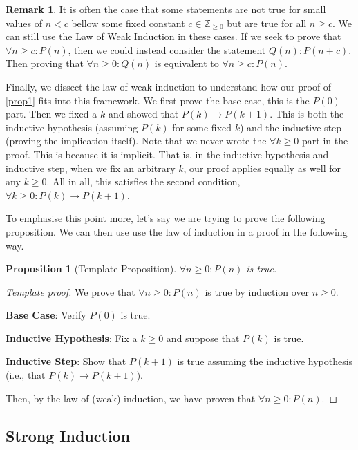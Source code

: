 \documentclass{article}
\theoremstyle{plain}
\newtheorem*{proposition*}{Proposition}
\theoremstyle{definition}
\newtheorem{remark}[theorem]{Remark}
\newcommand{\ra}{\rightarrow}
\newcommand{\ZZ}{\mathbb{Z}_{\geq 0}}
\begin{document}
\begin{remark}
    It is often the case that some statements are not true for small values of \(n < c\) bellow some fixed constant \(c \in \ZZ\) but are true for all \(n \geq c\). We can still use the Law of Weak Induction in these cases. If we seek to prove that \(\forall n \geq c : P(n)\), then we could instead consider the statement \(Q(n) : P(n + c)\). Then proving that \(\forall n \geq 0: Q(n)\) is equivalent to \(\forall n \geq c : P(n)\).
\end{remark}

Finally, we dissect the law of weak induction to understand how our proof of \cref{prop1} fits into this framework. We first prove the base case, this is the \(P(0)\) part. Then we fixed a \(k\) and showed that \(P(k) \ra P(k+1)\). This is both the inductive hypothesis (assuming \(P(k)\) for some fixed \(k\)) and the inductive step (proving the implication itself). Note that we never wrote the \(\forall k \geq 0\) part in the proof. This is because it is implicit. That is, in the inductive hypothesis and inductive step, when we fix an arbitrary \(k\), our proof applies equally as well for any \(k \geq 0\). All in all, this satisfies the second condition, \(\forall k \geq 0 : P(k) \ra P(k+1)\).

To emphasise this point more, let's say we are trying to prove the following proposition. We can then use use the law of induction in a proof in the following way.

\begin{proposition*}[Template Proposition]
    \(\forall n \geq 0 : P(n)\) is true.
\end{proposition*}
\begin{proof}[Template proof]
    We prove that \(\forall n \geq 0 : P(n)\) is true by induction over \(n \geq 0\).
    
    \textbf{Base Case}: Verify \(P(0)\) is true.

    \textbf{Inductive Hypothesis}: Fix a \(k \geq 0\) and suppose that \(P(k)\) is true.

    \textbf{Inductive Step}: Show that \(P(k+1)\) is true assuming the inductive hypothesis (i.e., that \(P(k) \ra P(k+1)\)).

    Then, by the law of (weak) induction, we have proven that \(\forall n \geq 0 : P(n)\).
\end{proof} 
 
\subsection{Strong Induction}
\end{document}
